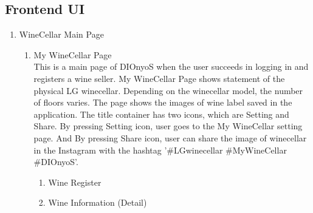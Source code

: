 \documentclass[conference]{IEEEtran}
\numberwithin{figure}{subsection}
\begin{document}
\subsection{Frontend UI}
\begin{enumerate}
    \item WineCellar Main Page
    \begin{enumerate}
        \item My WineCellar Page\\
        This is a main page of DIOnyoS when the user succeeds in logging in and registers a wine seller. My WineCellar Page shows statement of the physical LG winecellar. Depending on the winecellar model, the number of floors varies. The page shows the images of wine label saved in the application. The title container has two icons, which are Setting and Share. By pressing Setting icon, user goes to the My WineCellar setting page. And By pressing Share icon, user can share the image of winecellar in the Instagram with the hashtag '\#LGwinecellar \#MyWineCellar \#DIOnyoS'.
        \begin{enumerate}
            \item Wine Register
            \item Wine Information (Detail)
            

\end{enumerate}
\end{enumerate}
\end{enumerate}
\end{document}
